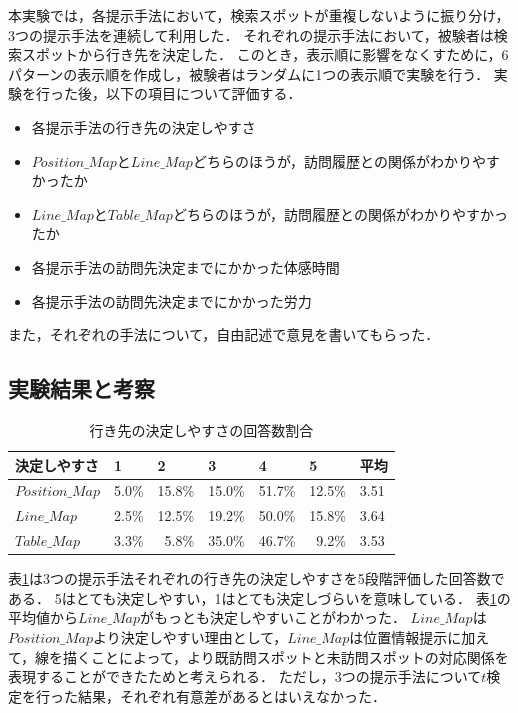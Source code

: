 \documentclass{deimj}
\begin{document}
本実験では，各提示手法において，検索スポットが重複しないように振り分け，3つの提示手法を連続して利用した．
それぞれの提示手法において，被験者は検索スポットから行き先を決定した．
このとき，表示順に影響をなくすために，6パターンの表示順を作成し，被験者はランダムに1つの表示順で実験を行う．
実験を行った後，以下の項目について評価する．
\begin{itemize}
  \item 各提示手法の行き先の決定しやすさ
  \item $Position\_Map$と$Line\_Map$どちらのほうが，訪問履歴との関係がわかりやすかったか
  \item $Line\_Map$と$Table\_Map$どちらのほうが，訪問履歴との関係がわかりやすかったか
  \item 各提示手法の訪問先決定までにかかった体感時間
  \item 各提示手法の訪問先決定までにかかった労力
\end{itemize}
また，それぞれの手法について，自由記述で意見を書いてもらった．

\subsection{実験結果と考察}
\begin{table}[t]
    \caption{行き先の決定しやすさの回答数割合}
    \label{table:行き先の決定しやすさ}
    \centering
    \begin{tabular}{l|rrrrr|l}
    \hline
    決定しやすさ   & \multicolumn{1}{l}{1} & \multicolumn{1}{l}{2} & \multicolumn{1}{l}{3} & \multicolumn{1}{l}{4} & \multicolumn{1}{l|}{5} & 平均    \\ \hline
    $Position\_Map$ & 5.0\%                & 15.8\%               & 15.0\%               & 51.7\%               & 12.5\%                & 3.51 \\
    $Line\_Map$     & 2.5\%                & 12.5\%               & 19.2\%               & 50.0\%               & 15.8\%                & 3.64 \\
    $Table\_Map$    & 3.3\%                & 5.8\%                & 35.0\%               & 46.7\%               & 9.2\%                 & 3.53 \\ \hline
    \end{tabular}
\end{table}
表\ref{table:行き先の決定しやすさ}は3つの提示手法それぞれの行き先の決定しやすさを5段階評価した回答数である．
5はとても決定しやすい，1はとても決定しづらいを意味している．
表\ref{table:行き先の決定しやすさ}の平均値から$Line\_Map$がもっとも決定しやすいことがわかった．
$Line\_Map$は$Position\_Map$より決定しやすい理由として，$Line\_Map$は位置情報提示に加えて，線を描くことによって，より既訪問スポットと未訪問スポットの対応関係を表現することができたためと考えられる．
ただし，3つの提示手法について$t$検定を行った結果，それぞれ有意差があるとはいえなかった．
\end{document}
